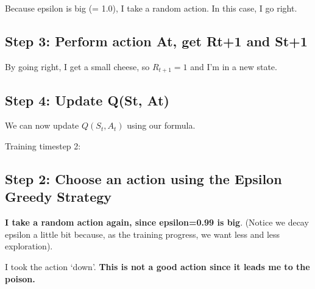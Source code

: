 \documentclass[11pt,a4paper]{article}
\begin{document}
Because epsilon is big (= 1.0), I take a random action. In this case, I go right.


\subsection{Step 3: Perform action At, get Rt+1 and St+1}\label{step-3-perform-action-at-get-rt1-and-st1}

By going right, I get a small cheese, so \(R_{t+1} = 1\) and I'm in a new state.


\subsection{Step 4: Update Q(St, At)}\label{step-4-update-qst-at-1}

We can now update \(Q(S_t, A_t)\) using our formula.



Training timestep 2:

\subsection{Step 2: Choose an action using the Epsilon Greedy Strategy}\label{step-2-choose-an-action-using-the-epsilon-greedy-strategy-2}

\textbf{I take a random action again, since epsilon=0.99 is big}. (Notice we decay epsilon a little bit because, as the training progress, we want less and less exploration).

I took the action `down'. \textbf{This is not a good action since it leads me to the poison.}
\end{document}
